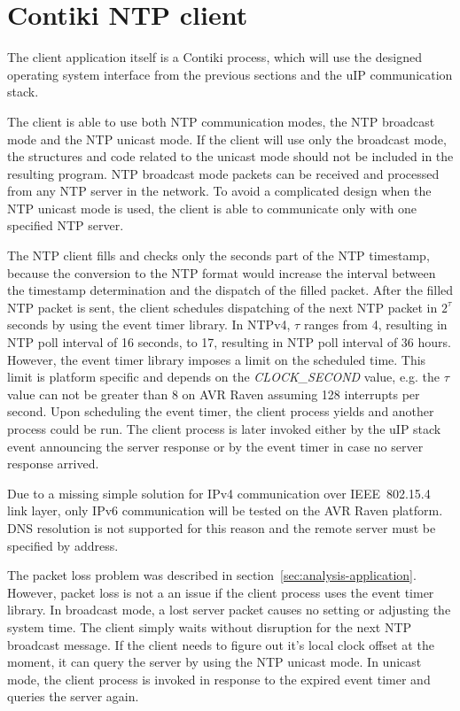 
\section{Contiki NTP client}\label{sec:design-client}
The client application itself is a Contiki process,
which will use the designed operating system interface from the previous sections
and the uIP communication stack.

The client is able to use both NTP communication modes,
the NTP broadcast mode and the NTP unicast mode.
If the client will use only the broadcast mode, the structures and code
related to the unicast mode should not be included in the resulting program.
NTP broadcast mode packets can be received and processed from any NTP server in the network.
To avoid a complicated design when the NTP unicast mode is used,
the client is able to communicate only with one specified NTP server.

The NTP client fills and checks only the seconds part of the NTP timestamp,
because the conversion to the NTP format would increase the interval
between the timestamp determination and the dispatch of the filled packet.
After the filled NTP packet is sent, the client schedules
dispatching of the next NTP packet in $2^{\tau}$ seconds %
by using the event timer library.
In NTPv4, $\tau$ ranges from 4, resulting in NTP poll interval of 16 seconds,
to 17, resulting in NTP poll interval of 36 hours.
However, the event timer library imposes a limit on the scheduled time.
This limit is platform specific and depends on the {\it{CLOCK\_SECOND}} value,
e.g. the $\tau$ value can not be greater than 8 on AVR Raven assuming 128 interrupts per second.
Upon scheduling the event timer, the client process yields
and another process could be run.
The client process is later invoked either by the uIP stack event
announcing the server response
or by the event timer in case no server response arrived.

Due to a missing simple solution for IPv4 communication over IEEE~802.15.4 link layer,
only IPv6 communication will be tested on the AVR Raven platform.
DNS resolution is not supported for this reason
and the remote server must be specified by address.

The packet loss problem was described in section~\ref{sec:analysis-application}.
However, packet loss is not a an issue if the client process uses the event timer library.
In broadcast mode, a lost server packet causes no setting or adjusting the system time.
The client simply waits without disruption for the next NTP broadcast message.
If the client needs to figure out it's local clock offset at the moment,
it can query the server by using the NTP unicast mode.
In unicast mode, the client process is invoked in response to the expired event timer
and queries the server again.

